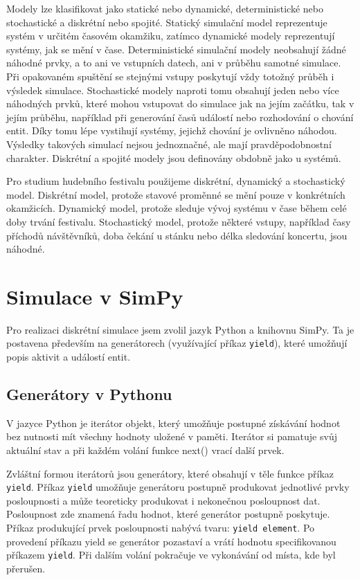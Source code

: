 \documentclass[12pt,a4paper]{article}
\begin{document}
Modely lze klasifikovat jako statické nebo dynamické, deterministické nebo stochastické a diskrétní nebo spojité. Statický simulační model reprezentuje systém v určitém časovém okamžiku, zatímco dynamické modely reprezentují systémy, jak se mění v čase. Deterministické simulační modely neobsahují žádné náhodné prvky, a to ani ve vstupních datech, ani v průběhu samotné simulace. Při opakovaném spuštění se stejnými vstupy poskytují vždy totožný průběh i výsledek simulace. Stochastické modely naproti tomu obsahují jeden nebo více náhodných prvků, které mohou vstupovat do simulace jak na jejím začátku, tak v jejím průběhu, například při generování časů událostí nebo rozhodování o chování entit. Díky tomu lépe vystihují systémy, jejichž chování je ovlivněno náhodou. Výsledky takových simulací nejsou jednoznačné, ale mají pravděpodobnostní charakter. Diskrétní a spojité modely jsou definovány obdobně jako u systémů.

Pro studium hudebního festivalu použijeme diskrétní, dynamický a stochastický model. Diskrétní model, protože stavové proměnné se mění pouze v konkrétních okamžicích. Dynamický model, protože sleduje vývoj systému v čase během celé doby trvání festivalu. Stochastický model, protože některé vstupy, například časy příchodů návštěvníků, doba čekání u stánku nebo délka sledování koncertu, jsou náhodné.

\section{Simulace v SimPy}
Pro realizaci diskrétní simulace jsem zvolil jazyk Python a knihovnu SimPy. Ta je postavena především na generátorech (využívající příkaz \texttt{yield}), které umožňují popis aktivit a událostí entit.

\subsection{Generátory v Pythonu}
V jazyce Python je iterátor objekt, který umožňuje postupné získávání hodnot bez nutnosti mít všechny hodnoty uložené v paměti. Iterátor si pamatuje svůj aktuální stav a při každém volání funkce next() vrací další prvek.

Zvláštní formou iterátorů jsou generátory, které obsahují v těle funkce příkaz \texttt{yield}. Příkaz \texttt{yield} umožňuje generátoru postupně produkovat jednotlivé prvky posloupnosti a může teoreticky produkovat i nekonečnou posloupnost dat. Posloupnost zde znamená řadu hodnot, které generátor postupně poskytuje. Příkaz produkující prvek posloupnosti nabývá tvaru: \texttt{yield element}. Po provedení příkazu yield se generátor pozastaví a vrátí hodnotu specifikovanou příkazem \texttt{yield}. Při dalším volání pokračuje ve vykonávání od místa, kde byl přerušen.
\end{document}
